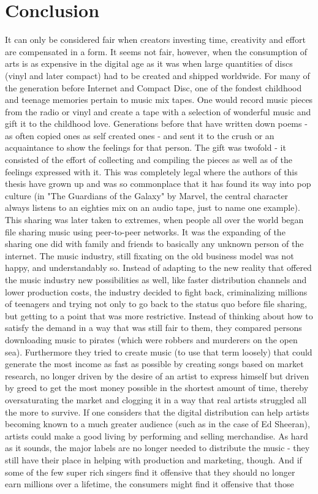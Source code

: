 \documentclass[a4paper]{report}
\begin{document}
\chapter{Conclusion}
\label{ch:Concl}
It can only be considered fair when creators investing time, creativity and effort are compensated in a form. It seems not fair, however, when the consumption of arts is as expensive in the digital age as it was when large quantities of discs (vinyl and later compact) had to be created and shipped worldwide. For many of the generation before Internet and Compact Disc, one of the fondest childhood and teenage memories pertain to music mix tapes. One would record music pieces from the radio or vinyl and create a tape with a selection of wonderful music and gift it to the childhood love. Generations before that have written down poems - as often copied ones as self created ones - and sent it to the crush or an acquaintance to show the feelings for that person. The gift was twofold - it consisted of the effort of collecting and compiling the pieces as well as of the feelings expressed with it. This was completely legal where the authors of this thesis have grown up and was so commonplace that it has found its way into pop culture (in "The Guardians of the Galaxy" by Marvel, the central character always listens to an eighties mix on an audio tape, just to name one example). This sharing was later taken to extremes, when people all over the world began file sharing music using peer-to-peer networks. It was the expanding of the sharing one did with family and friends to basically any unknown person of the internet. The music industry, still fixating on the old business model was not happy, and understandably so. Instead of adapting to the new reality that offered the music industry new possibilities as well, like faster distribution channels and lower production costs, the industry decided to fight back, criminalizing millions of teenagers and trying not only to go back to the status quo before file sharing, but getting to a point that was more restrictive. Instead of thinking about how to satisfy the demand in a way that was still fair to them, they compared persons downloading music to pirates (which were robbers and murderers on the open sea). Furthermore they tried to create music (to use that term loosely) that could generate the most income as fast as possible by creating songs based on market research, no longer driven by the desire of an artist to express himself but driven by greed to get the most money possible in the shortest amount of time, thereby oversaturating the market and clogging it in a way that real artists struggled all the more to survive. If one considers that the digital distribution can help artists becoming known to a much greater audience (such as in the case of Ed Sheeran), artists could make a good living by performing and selling merchandise. As hard as it sounds, the major labels are no longer needed to distribute the music - they still have their place in helping with production and marketing, though. And if some of the few super rich singers find it offensive that they should no longer earn millions over a lifetime, the consumers might find it offensive that those 
\end{document}
